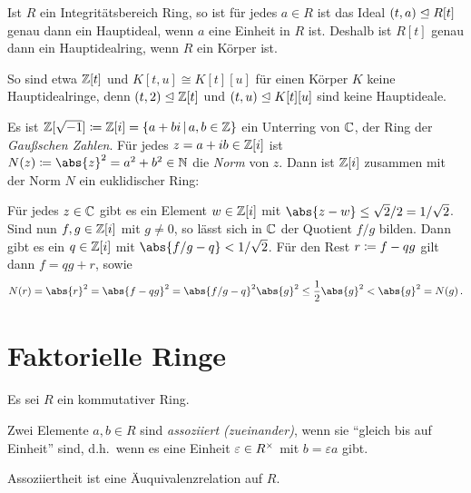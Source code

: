 \begin{remark}
  Ist $R$ ein Integritätsbereich Ring, so ist für jedes $a \in R$ ist das Ideal $(t, a) \mathrel{\trianglelefteq} R[t]$ genau dann ein Hauptideal, wenn $a$ eine Einheit in $R$ ist.
  Deshalb ist $R[t]$ genau dann ein Hauptidealring, wenn $R$ ein Körper ist.
  
  So sind etwa $\mathbb{Z}[t]$ und $K[t,u] \cong K[t][u]$ für einen Körper $K$ keine Hauptidealringe, denn $(t, 2) \mathrel{\trianglelefteq} \mathbb{Z}[t]$ und $(t,u) \mathrel{\trianglelefteq} K[t][u]$ sind keine Hauptideale.
\end{remark}

\begin{example}
  Es ist $\Integer[\sqrt{-1}] \defined \Integer[i] = \{a + bi \suchthat a, b \in \Integer\}$ ein Unterring von $\mathbb{C}$, der Ring der \emph{Gaußschen Zahlen}.
  Für jedes $z = a+ib \in \mathbb{Z}[i]$ ist $N(z) \defined \abs{z}^2 = a^2 + b^2 \in \Natural$ die \emph{Norm} von $z$.
  Dann ist $\mathbb{Z}[i]$ zusammen mit der Norm $N$ ein euklidischer Ring:
  
  Für jedes $z \in \mathbb{C}$ gibt es ein Element $w \in \mathbb{Z}[i]$ mit $\abs{z-w} \leq \sqrt{2}/2 = 1/\sqrt{2}$.
  Sind nun $f, g \in \mathbb{Z}[i]$ mit $g \neq 0$, so lässt sich in $\mathbb{C}$ der Quotient $f/g$ bilden.
  Dann gibt es ein $q \in \mathbb{Z}[i]$ mit $\abs{f/g - q} < 1/\sqrt{2}$.
  Für den Rest $r \coloneqq f - qg$ gilt dann $f = qg + r$, sowie
  \[
          N(r)
    =     \abs{r}^2
    =     \abs{f - qg}^2
    =     \abs{f/g - q}^2 \abs{g}^2
    \leq  \frac{1}{2} \abs{g}^2
    <     \abs{g}^2
    =     N(g) \,.
  \]
\end{example}





\section{Faktorielle Ringe}

Es sei $R$ ein kommutativer Ring.

\begin{definition}
  Zwei Elemente $a, b \in R$ sind \emph{assoziiert \textup(zueinander\textup)}, wenn sie \enquote{gleich bis auf Einheit} sind, d.h.\ wenn es eine Einheit $\varepsilon \in R^{\times}$ mit $b = \varepsilon a$ gibt.
\end{definition}

\begin{lemma}
  Assoziiertheit ist eine Äuquivalenzrelation auf $R$.
\end{lemma}

